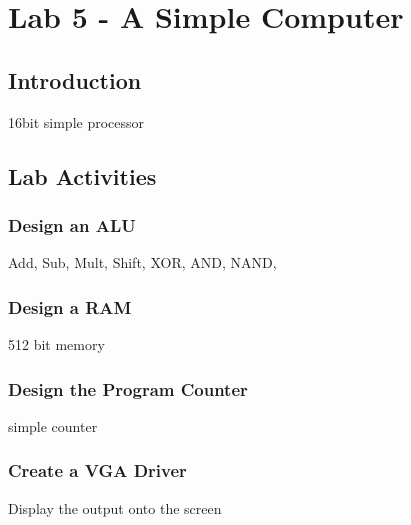 \section{Lab 5 - A Simple Computer}

\subsection{Introduction}
16bit simple processor

\subsection{Lab Activities}

\subsubsection{Design an ALU}
Add, Sub, Mult, Shift, XOR, AND, NAND,

\subsubsection{Design a RAM}
512 bit memory

\subsubsection{Design the Program Counter}
simple counter

\subsubsection{Create a VGA Driver}
Display the output onto the screen

